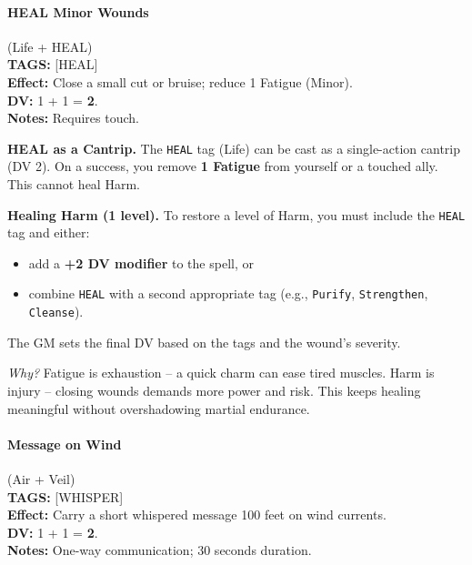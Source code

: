 \paragraph{HEAL Minor Wounds} (Life + HEAL) \\
\textbf{TAGS:} {[HEAL]} \\
\textbf{Effect:} Close a small cut or bruise; reduce 1 Fatigue (Minor). \\
\textbf{DV:} 1 + 1 = \textbf{2}. \\
\textbf{Notes:} Requires touch.

\begin{tcolorbox}[
    colback=parchment,
    colframe=bronze,
    sharp corners,
    breakable,
    enhanced,
    title=Healing Harm and Fatigue,
    fonttitle=\bfseries,
    attach boxed title to top left={yshift=-2mm,xshift=4mm},
    boxed title style={colback=bronze, colframe=bronze, sharp corners, rounded corners=north}
]

\textbf{HEAL as a Cantrip.} The \texttt{HEAL} tag (Life) can be cast as a single-action cantrip (DV 2). On a success, you remove \textbf{1 Fatigue} from yourself or a touched ally. This cannot heal Harm.

\textbf{Healing Harm (1 level).} To restore a level of Harm, you must include the \texttt{HEAL} tag and either:
\begin{itemize}
    \item add a \textbf{+2 DV modifier} to the spell, or
    \item combine \texttt{HEAL} with a second appropriate tag (e.g., \texttt{Purify}, \texttt{Strengthen}, \texttt{Cleanse}).
\end{itemize}
The GM sets the final DV based on the tags and the wound's severity.

\textit{Why?} Fatigue is exhaustion -- a quick charm can ease tired muscles. Harm is injury -- closing wounds demands more power and risk. This keeps healing meaningful without overshadowing martial endurance.

\end{tcolorbox}

\paragraph{Message on Wind} (Air + Veil) \\
\textbf{TAGS:} {[WHISPER]} \\
\textbf{Effect:} Carry a short whispered message 100 feet on wind currents. \\
\textbf{DV:} 1 + 1 = \textbf{2}. \\
\textbf{Notes:} One-way communication; 30 seconds duration.

